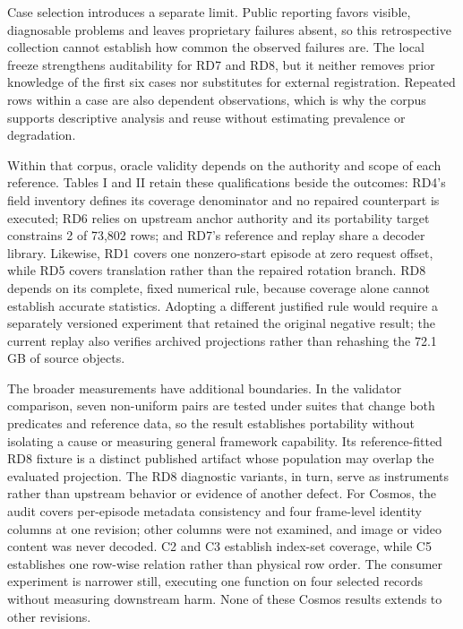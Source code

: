 \documentclass[conference]{IEEEtran}
\begin{document}
Case selection introduces a separate limit. Public reporting favors visible, diagnosable problems and leaves proprietary failures absent, so this retrospective collection cannot establish how common the observed failures are. The local freeze strengthens auditability for RD7 and RD8, but it neither removes prior knowledge of the first six cases nor substitutes for external registration. Repeated rows within a case are also dependent observations, which is why the corpus supports descriptive analysis and reuse without estimating prevalence or degradation.\par

Within that corpus, oracle validity depends on the authority and scope of each reference. Tables I and II retain these qualifications beside the outcomes: RD4's field inventory defines its coverage denominator and no repaired counterpart is executed; RD6 relies on upstream anchor authority and its portability target constrains 2 of 73,802 rows; and RD7's reference and replay share a decoder library. Likewise, RD1 covers one nonzero-start episode at zero request offset, while RD5 covers translation rather than the repaired rotation branch. RD8 depends on its complete, fixed numerical rule, because coverage alone cannot establish accurate statistics. Adopting a different justified rule would require a separately versioned experiment that retained the original negative result; the current replay also verifies archived projections rather than rehashing the 72.1 GB of source objects.\par

The broader measurements have additional boundaries. In the validator comparison, seven non-uniform pairs are tested under suites that change both predicates and reference data, so the result establishes portability without isolating a cause or measuring general framework capability. Its reference-fitted RD8 fixture is a distinct published artifact whose population may overlap the evaluated projection. The RD8 diagnostic variants, in turn, serve as instruments rather than upstream behavior or evidence of another defect. For Cosmos, the audit covers per-episode metadata consistency and four frame-level identity columns at one revision; other columns were not examined, and image or video content was never decoded. C2 and C3 establish index-set coverage, while C5 establishes one row-wise relation rather than physical row order. The consumer experiment is narrower still, executing one function on four selected records without measuring downstream harm. None of these Cosmos results extends to other revisions.\par
\end{document}
